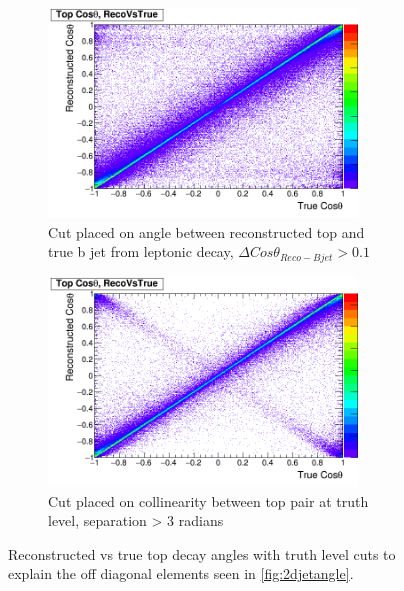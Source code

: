 \begin{figure}
  \centering
  \begin{subfigure}{.5\textwidth}
    \centering
    \includegraphics[width=0.9\textwidth]{figures/CosThetaRecoVsMC_NotNextToLepTop.png}
    \caption[Cut placed on angle between reconstructed top and true b jet from leptonic decay]{Cut placed on angle between reconstructed top and true b jet from leptonic decay, $\Delta Cos\theta_{Reco-Bjet}>0.1$}
    \label{fig:2djetangle_farfromleptop}
  \end{subfigure}%
  \begin{subfigure}{.5\textwidth}
    \centering
    \includegraphics[width=0.9\textwidth]{figures/CosThetaRecoVsMC_MCTopsWellSeparated.png}
    \caption[Cut placed on collinearity between top pair at truth level]{Cut placed on collinearity between top pair at truth level, separation > 3 radians}
    \label{fig:2djetangle_goodtopseparation}
  \end{subfigure}
  \caption[Reconstructed vs true top decay angles with truth level cuts]{Reconstructed vs true top decay angles with truth level cuts to explain the off diagonal elements seen in \ref{fig:2djetangle}.}
  \label{fig:2djetangle_explanations}
\end{figure}





